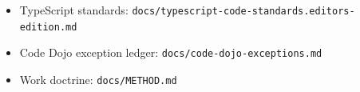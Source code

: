 \begin{itemize}
\tightlist
\item
  TypeScript standards: \texttt{d\allowbreak{}o\allowbreak{}c\allowbreak{}s\allowbreak{}/\allowbreak{}t\allowbreak{}y\allowbreak{}p\allowbreak{}e\allowbreak{}s\allowbreak{}c\allowbreak{}r\allowbreak{}i\allowbreak{}p\allowbreak{}t\allowbreak{}-\allowbreak{}c\allowbreak{}o\allowbreak{}d\allowbreak{}e\allowbreak{}-\allowbreak{}s\allowbreak{}t\allowbreak{}a\allowbreak{}n\allowbreak{}d\allowbreak{}a\allowbreak{}r\allowbreak{}d\allowbreak{}s\allowbreak{}.\allowbreak{}e\allowbreak{}d\allowbreak{}i\allowbreak{}t\allowbreak{}o\allowbreak{}r\allowbreak{}s\allowbreak{}-\allowbreak{}e\allowbreak{}d\allowbreak{}i\allowbreak{}t\allowbreak{}i\allowbreak{}o\allowbreak{}n\allowbreak{}.\allowbreak{}m\allowbreak{}d}
\item
  Code Dojo exception ledger: \texttt{d\allowbreak{}o\allowbreak{}c\allowbreak{}s\allowbreak{}/\allowbreak{}c\allowbreak{}o\allowbreak{}d\allowbreak{}e\allowbreak{}-\allowbreak{}d\allowbreak{}o\allowbreak{}j\allowbreak{}o\allowbreak{}-\allowbreak{}e\allowbreak{}x\allowbreak{}c\allowbreak{}e\allowbreak{}p\allowbreak{}t\allowbreak{}i\allowbreak{}o\allowbreak{}n\allowbreak{}s\allowbreak{}.\allowbreak{}m\allowbreak{}d}
\item
  Work doctrine: \texttt{d\allowbreak{}o\allowbreak{}c\allowbreak{}s\allowbreak{}/\allowbreak{}M\allowbreak{}E\allowbreak{}T\allowbreak{}H\allowbreak{}O\allowbreak{}D\allowbreak{}.\allowbreak{}m\allowbreak{}d}
\end{itemize}

